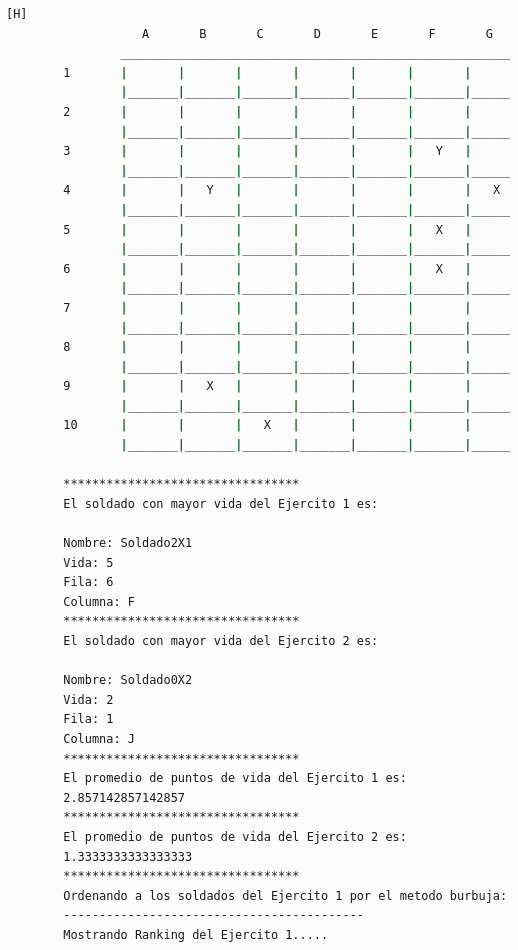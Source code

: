 \documentclass{article}
\begin{document}
\begin{lstlisting}[language=bash,caption={La ejecución: \textcolor{red}{PARA PODER VER LA TABLA COMPLETAMENTE MIRAR LA PLANTILLA DE LATEX O EJECUTARLO: }}][H]
				   A       B       C       D       E       F       G       H       I       J
				_________________________________________________________________________________
		1       |       |       |       |       |       |       |       |       |       |   Y   |
				|_______|_______|_______|_______|_______|_______|_______|_______|_______|_______|
		2       |       |       |       |       |       |       |       |       |       |       |
				|_______|_______|_______|_______|_______|_______|_______|_______|_______|_______|
		3       |       |       |       |       |       |   Y   |       |       |       |       |
				|_______|_______|_______|_______|_______|_______|_______|_______|_______|_______|
		4       |       |   Y   |       |       |       |       |   X   |       |       |       |
				|_______|_______|_______|_______|_______|_______|_______|_______|_______|_______|
		5       |       |       |       |       |       |   X   |       |       |       |       |
				|_______|_______|_______|_______|_______|_______|_______|_______|_______|_______|
		6       |       |       |       |       |       |   X   |       |       |       |       |
				|_______|_______|_______|_______|_______|_______|_______|_______|_______|_______|
		7       |       |       |       |       |       |       |       |       |       |   X   |
				|_______|_______|_______|_______|_______|_______|_______|_______|_______|_______|
		8       |       |       |       |       |       |       |       |       |       |       |
				|_______|_______|_______|_______|_______|_______|_______|_______|_______|_______|
		9       |       |   X   |       |       |       |       |       |   X   |       |       |
				|_______|_______|_______|_______|_______|_______|_______|_______|_______|_______|
		10      |       |       |   X   |       |       |       |       |       |       |       |
				|_______|_______|_______|_______|_______|_______|_______|_______|_______|_______|
		
		*********************************
		El soldado con mayor vida del Ejercito 1 es: 
		
		Nombre: Soldado2X1
		Vida: 5
		Fila: 6
		Columna: F
		*********************************
		El soldado con mayor vida del Ejercito 2 es: 
		
		Nombre: Soldado0X2
		Vida: 2
		Fila: 1
		Columna: J
		*********************************
		El promedio de puntos de vida del Ejercito 1 es: 
		2.857142857142857
		*********************************
		El promedio de puntos de vida del Ejercito 2 es: 
		1.3333333333333333
		*********************************
		Ordenando a los soldados del Ejercito 1 por el metodo burbuja: 
		------------------------------------------
		Mostrando Ranking del Ejercito 1.....
		

\end{lstlisting}
\end{document}
